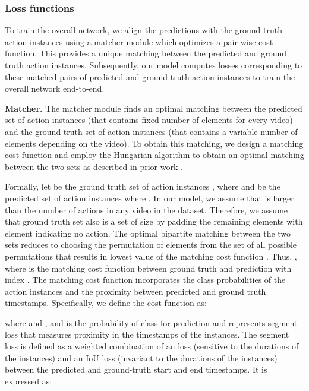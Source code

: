 \documentclass[10pt,twocolumn,letterpaper]{article}
\begin{document}
\subsubsection{Loss functions}
\label{subsec:loss}
To train the overall network, we align the predictions with the ground truth action instances using a matcher module which optimizes a pair-wise cost function. This provides a unique matching between the predicted and ground truth action instances. Subsequently, our model computes losses corresponding to these matched pairs of predicted and ground truth action instances to train the overall network end-to-end.

\vspace{0.05in}
\noindent
\textbf{Matcher. } The matcher module finds an optimal matching between the predicted set of action instances (that contains fixed number of elements for every video) and the ground truth set of action instances (that contains a variable number of elements depending on the video). To obtain this matching, we design a matching cost function and employ the Hungarian algorithm to obtain an optimal matching between the two sets as described in prior work \cite{stewart2016end}.

Formally, let  be the ground truth set of action instances , where  and  be the predicted set of action instances  where . 
In our model, we assume that  is larger than the number of actions in any video in the dataset. Therefore, we assume that ground truth set  also is a set of size  by padding the remaining  elements with  element indicating no action. The optimal bipartite matching between the two sets reduces to choosing the permutation of  elements  from the set of all possible permutations  that results in lowest value of the matching cost function . 
Thus, 
,
where  is the matching cost function between ground truth  and prediction with index . The matching cost function
incorporates the class probabilities of the action instances and the proximity between predicted and ground truth timestamps. Specifically, we define the cost function as:
 
where  and , and
 is the probability of class  for prediction  and  represents segment loss that measures proximity in the timestamps of the instances. 
The segment loss is defined as a weighted combination of an  loss (sensitive to the durations of the instances) and an IoU loss (invariant to the durations of the instances) between the predicted and ground-truth start and end timestamps. It is expressed as:
\end{document}

